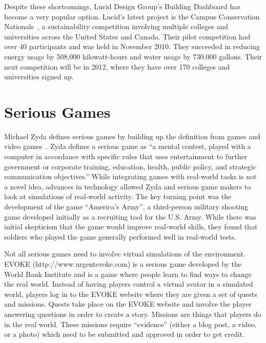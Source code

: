 Despite these shortcomings, Lucid Design Group's Building Dashboard has become a very popular option. Lucid's latest project is the Campus Conservation Nationals~\cite{lucid-ccn}, a sustainability competition involving multiple colleges and universities across the United States and Canada. Their pilot competition had over 40 participants and was held in November 2010. They succeeded in reducing energy usage by 508,000 kilowatt-hours and water usage by 730,000 gallons. Their next competition will be in 2012, where they have over 170 colleges and universities signed up.

\section{Serious Games}
\label{related:serious-games}

Michael Zyda defines serious games by building up the definition from games and video games~\cite{zyda-from-visual-sim}.  Zyda defines a serious game as ``a mental contest, played with a computer in accordance with specific rules that uses entertainment to further government or corporate training, education, health, public policy, and strategic communication objectives.''  While integrating games with real-world tasks is not a novel idea, advances in technology allowed Zyda and serious game makers to look at simulations of real-world activity.  The key turning point was the development of the game ``America's Army'', a third-person military shooting game developed initially as a recruiting tool for the U.S. Army.  While there was initial skepticism that the game would improve real-world skills, they found that soldiers who played the game generally performed well in real-world tests.

Not all serious games need to involve virtual simulations of the environment.  EVOKE (http://www.urgentevoke.com) is a serious game developed by the World Bank Institute and is a game where people learn to find ways to change the real world.  Instead of having players control a virtual avatar in a simulated world, players log in to the EVOKE website where they are given a set of quests and missions.  Quests take place on the EVOKE website and involve the player answering questions in order to create a story.  Missions are things that players do in the real world.  These missions require ``evidence'' (either a blog post, a video, or a photo) which need to be submitted and approved in order to get credit.

